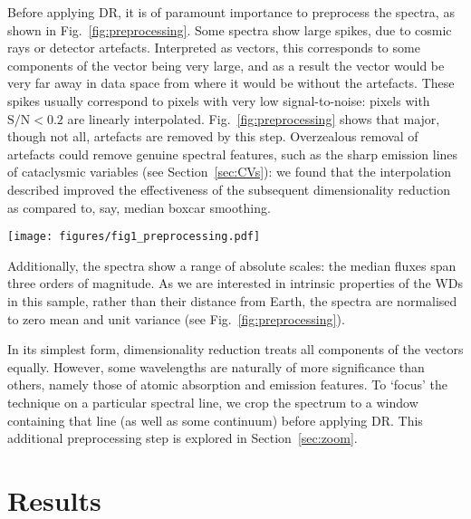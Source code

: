 \documentclass[fleqn,usenatbib]{mnras}
\begin{document}
Before applying DR, it is of paramount importance to preprocess the spectra, as shown in Fig.~\ref{fig:preprocessing}.
Some spectra show large spikes, due to cosmic rays or detector artefacts.
Interpreted as vectors, this corresponds to some components of the vector being very large, and as a result the vector would be very far away in data space from where it would be without the artefacts.
These spikes usually correspond to pixels with very low signal-to-noise: pixels with $\mathrm{S}/\mathrm{N}<0.2$ are linearly interpolated.
Fig.~\ref{fig:preprocessing} shows that major, though not all, artefacts are removed by this step.
Overzealous removal of artefacts could remove genuine spectral features, such as the sharp emission lines of cataclysmic variables (see Section~\ref{sec:CVs}): we found that the interpolation described improved the effectiveness of the subsequent dimensionality reduction as compared to, say, median boxcar smoothing.

\begin{figure*}
\centering
\texttt{[image: figures/fig1\_preprocessing.pdf]}
\caption{
    Preprocessing stages, as illustrated on a cherry-picked DESI EDR spectrum.
    The upper panel shows the raw spectrum, with several artefacts.
    The second panel shows that the signal-to-noise ratio is very low near many of these artefacts; where it falls below 0.2, the pixels are interpolated.
    The spectra are then rescaled to zero mean and unit variance, as shown in the lower panel.
    Major artefacts have been removed, though some smaller artefacts remain.
}
\label{fig:preprocessing}
\end{figure*}

Additionally, the spectra show a range of absolute scales: the median fluxes span three orders of magnitude.
As we are interested in intrinsic properties of the WDs in this sample, rather than their distance from Earth, the spectra are normalised to zero mean and unit variance (see Fig.~\ref{fig:preprocessing}).

In its simplest form, dimensionality reduction treats all components of the vectors equally.
However, some wavelengths are naturally of more significance than others, namely those of atomic absorption and emission features.
To `focus' the technique on a particular spectral line, we crop the spectrum to a window containing that line (as well as some continuum) before applying DR.
This additional preprocessing step is explored in Section~\ref{sec:zoom}.

\section{Results}
\label{sec:results}
\end{document}
